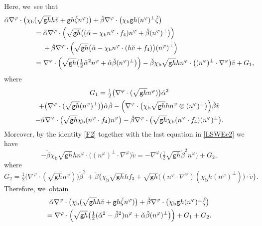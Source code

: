 \documentclass[11pt]{article}
\newcommand{\gr}{{\mathtt g}}
\theoremstyle{definition}
\begin{document}
Here, we~see that
\begin{align*}
\check{\alpha}\nabla^\varphi\cdot\bigl(\chi_\mathrm{b}&(\sqrt{\gr h}h\check{v} + \gr h\check{\zeta}n^\varphi)\bigr)
+ \check{\beta}\nabla^\varphi\cdot\bigl(\chi_\mathrm{b}\gr h(n^\varphi)^\perp\check{\zeta}\bigr) \\
&= \check{\alpha}\nabla^\varphi\cdot\Bigl(\sqrt{\gr h}\bigl((\check{\alpha}-\chi_\mathrm{b}n^\varphi\cdot f_4)n^\varphi + \check{\beta}(n^\varphi)^\perp\bigr)\Bigr) \\
&\quad\; + \check{\beta}\nabla^\varphi\cdot\Bigl(\sqrt{\gr h}\bigl(\check{\alpha}-\chi_\mathrm{b}n^\varphi\cdot(h\check{v}+f_4)\bigr) (n^\varphi)^\perp\Bigr) \\
&= \nabla^\varphi\cdot\Bigl(\sqrt{\gr h}\bigl(\tfrac12\check{\alpha}^2n^\varphi + \check{\alpha}\check{\beta}(n^\varphi)^\perp\bigr)\Bigr)
- \check{\beta}\chi_\mathrm{b}\sqrt{\gr h}h n^\varphi\cdot\bigl((n^\varphi)^\perp\cdot\nabla^\varphi\bigr)\check{v} + G_1,
\end{align*}
where
\begin{multline*}
G_1
= \tfrac12\bigl(\nabla^\varphi\cdot(\sqrt{\gr h}n^\varphi)\bigr)\check{\alpha}^2\\
+ \bigl(\nabla^\varphi\cdot(\sqrt{\gr h}(n^\varphi)^\perp)\bigr)\check{\alpha}\check{\beta}
- \Bigl(\nabla^\varphi\cdot\bigl(\chi_\mathrm{b}\sqrt{\gr h}h n^\varphi\otimes(n^\varphi)^\perp\bigr)\Bigr)\check{\beta}\check{v}\\
- \check{\alpha}\nabla^\varphi\cdot\bigl(\sqrt{\gr h}\chi_\mathrm{b}(n^\varphi\cdot f_4)n^\varphi\bigr)
- \check{\beta}\nabla^\varphi\cdot\bigl(\sqrt{\gr h}\chi_\mathrm{b}(n^\varphi\cdot f_4)(n^\varphi)^\perp\bigr).
\end{multline*}
Moreover, by the identity \eqref{F2} together with the last equation in \eqref{LSWEe2} we have
\[
- \check{\beta}\chi_\mathrm{b}\sqrt{\gr h}h n^\varphi\cdot\bigl((n^\varphi)^\perp\cdot\nabla^\varphi\bigr)\check{v}
= -\nabla^\varphi\bigl(\tfrac12\sqrt{\gr h}\check{\beta}^2n^\varphi\bigr) + G_2,
\]
where
\[
G_2 = \tfrac12\bigl(\nabla^\varphi\cdot(\sqrt{\gr h} n^\varphi)\bigr)\check{\beta}^2
+ \check{\beta}\bigl\{ \chi_\mathrm{b}\sqrt{\gr h}hf_3 + \sqrt{\gr h}\bigl((n^\varphi\cdot\nabla^\varphi)(\chi_\mathrm{b}h(n^\varphi)^\perp)\bigr)\cdot\check{v} \bigr\}.
\]
Therefore, we~obtain
\begin{multline}\label{EqCF2}
\check{\alpha}\nabla^\varphi\cdot\bigl(\chi_\mathrm{b}(\sqrt{\gr h}h\check{v} + \gr h\check{\zeta}n^\varphi)\bigr)
+ \check{\beta}\nabla^\varphi\cdot\bigl(\chi_\mathrm{b}\gr h(n^\varphi)^\perp\check{\zeta}\bigr) \\
= \nabla^\varphi\cdot\Bigl(\sqrt{\gr h}\bigl(\tfrac12(\check{\alpha}^2-\check{\beta}^2)n^\varphi + \check{\alpha}\check{\beta}(n^\varphi)^\perp\bigr)\Bigr) + G_1 + G_2.
\end{multline}
\end{document}
